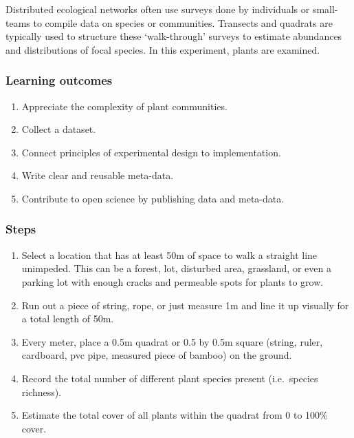 \documentclass[
]{book}
\providecommand{\tightlist}{%
  \setlength{\itemsep}{0pt}\setlength{\parskip}{0pt}}
\begin{document}
Distributed ecological networks often use surveys done by individuals or small-teams to compile data on species or communities. Transects and quadrats are typically used to structure these `walk-through' surveys to estimate abundances and distributions of focal species. In this experiment, plants are examined.

\hypertarget{learning-outcomes}{%
\subsubsection*{Learning outcomes}\label{learning-outcomes}}

\begin{enumerate}
\def\labelenumi{\arabic{enumi}.}
\tightlist
\item
  Appreciate the complexity of plant communities.\\
\item
  Collect a dataset.\\
\item
  Connect principles of experimental design to implementation.\\
\item
  Write clear and reusable meta-data.\\
\item
  Contribute to open science by publishing data and meta-data.
\end{enumerate}

\hypertarget{steps}{%
\subsubsection*{Steps}\label{steps}}

\begin{enumerate}
\def\labelenumi{\arabic{enumi}.}
\tightlist
\item
  Select a location that has at least 50m of space to walk a straight line unimpeded. This can be a forest, lot, disturbed area, grassland, or even a parking lot with enough cracks and permeable spots for plants to grow.\\
\item
  Run out a piece of string, rope, or just measure 1m and line it up visually for a total length of 50m.\\
\item
  Every meter, place a 0.5m quadrat or 0.5 by 0.5m square (string, ruler, cardboard, pvc pipe, measured piece of bamboo) on the ground.\\
\item
  Record the total number of different plant species present (i.e.~species richness).\\
\item
  Estimate the total cover of all plants within the quadrat from 0 to 100\% cover.
\end{enumerate}
\end{document}

